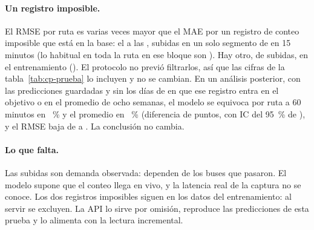 \paragraph{Un registro imposible.} El RMSE por ruta es varias veces mayor que el MAE por un registro de conteo
imposible que está en la base: el \CPAnomFecha{} a las \CPAnomHora, \CPAnomSubidas{} subidas en un solo segmento de
\CPAnomRuta{} en 15 minutos (lo habitual en toda la ruta en ese bloque son \CPAnomMediana). Hay otro, de
\CPAnomOtroSubidas{} subidas, en el entrenamiento (\CPAnomOtroFecha). El protocolo no previó filtrarlos, así que las
cifras de la tabla~\ref{tab:cp-prueba} lo incluyen y no se cambian. En un análisis posterior, con las predicciones
guardadas y sin los \CPAnomDias{} días de \CPAnomRuta{} en que ese registro entra en el objetivo o en el promedio de
ocho semanas, el modelo se equivoca por ruta a 60 minutos en \CPSinRutaModLX~\% y el promedio en \CPSinRutaPromLX~\%
(diferencia de \CPSinRutaDifLX{} puntos, con IC del 95~\% de \CPSinRutaDifICLX), y el RMSE baja de \CPRutaRMSELX{} a
\CPSinRutaRMSELX. La conclusión no cambia.

\paragraph{Lo que falta.} Las subidas son demanda observada: dependen de los buses que pasaron. El modelo supone que
el conteo llega en vivo, y la latencia real de la captura no se conoce. Los dos registros imposibles siguen en los
datos del entrenamiento: al servir se excluyen. La API lo sirve por omisión, reproduce las \CPReproFilas{}
predicciones de esta prueba y lo alimenta con la lectura incremental.

\setcounter{table}{\value{cptabla}}\setcounter{figure}{\value{cpfigura}}
\renewcommand{\thetable}{\arabic{table}}\renewcommand{\theHtable}{\arabic{table}}
\renewcommand{\thefigure}{\arabic{figure}}\renewcommand{\theHfigure}{\arabic{figure}}
